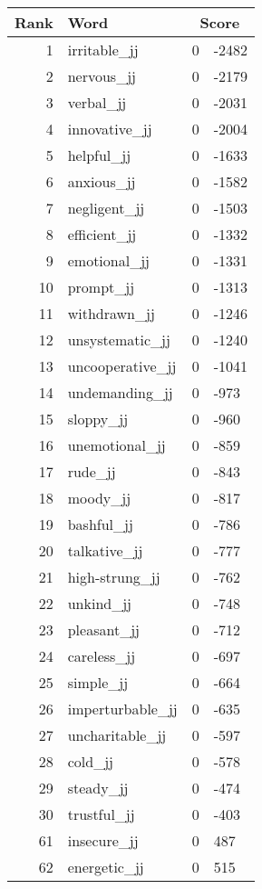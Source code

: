 \begin{longtable}[!htbp]{| rlr@{.}l |}
    \hline
    \textbf{Rank} & \textbf{Word} & \multicolumn{2}{c|}{\textbf{Score}} \\
    \hline
    \endhead
    1 & irritable\_jj & 0 & -2482 \\
    2 & nervous\_jj & 0 & -2179 \\
    3 & verbal\_jj & 0 & -2031 \\
    4 & innovative\_jj & 0 & -2004 \\
    5 & helpful\_jj & 0 & -1633 \\
    6 & anxious\_jj & 0 & -1582 \\
    7 & negligent\_jj & 0 & -1503 \\
    8 & efficient\_jj & 0 & -1332 \\
    9 & emotional\_jj & 0 & -1331 \\
    10 & prompt\_jj & 0 & -1313 \\
    11 & withdrawn\_jj & 0 & -1246 \\
    12 & unsystematic\_jj & 0 & -1240 \\
    13 & uncooperative\_jj & 0 & -1041 \\
    14 & undemanding\_jj & 0 & -973 \\
    15 & sloppy\_jj & 0 & -960 \\
    16 & unemotional\_jj & 0 & -859 \\
    17 & rude\_jj & 0 & -843 \\
    18 & moody\_jj & 0 & -817 \\
    19 & bashful\_jj & 0 & -786 \\
    20 & talkative\_jj & 0 & -777 \\
    21 & high-strung\_jj & 0 & -762 \\
    22 & unkind\_jj & 0 & -748 \\
    23 & pleasant\_jj & 0 & -712 \\
    24 & careless\_jj & 0 & -697 \\
    25 & simple\_jj & 0 & -664 \\
    26 & imperturbable\_jj & 0 & -635 \\
    27 & uncharitable\_jj & 0 & -597 \\
    28 & cold\_jj & 0 & -578 \\
    29 & steady\_jj & 0 & -474 \\
    30 & trustful\_jj & 0 & -403 \\
    61 & insecure\_jj & 0 & 487 \\
    62 & energetic\_jj & 0 & 515 \\

\end{longtable}
